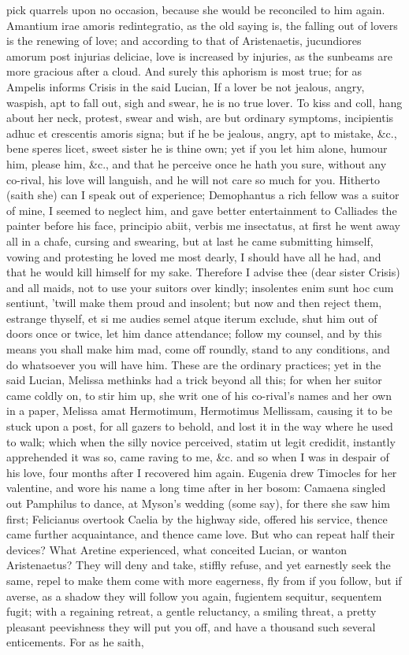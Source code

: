 {pick quarrels upon no occasion, because she would be reconciled to him
again. Amantium irae amoris redintegratio, as the old saying is, the
falling out of lovers is the renewing of love; and according to that of
Aristenaetis, jucundiores amorum post injurias deliciae, love is
increased by injuries, as the sunbeams are more gracious after a cloud.
And surely this aphorism is most true; for as Ampelis informs Crisis in
the said Lucian, If a lover be not jealous, angry, waspish, apt
to fall out, sigh and swear, he is no true lover. To kiss and coll,
hang about her neck, protest, swear and wish, are but ordinary
symptoms, incipientis adhuc et crescentis amoris signa; but if he be
jealous, angry, apt to mistake, \&c., bene speres licet, sweet sister he
is thine own; yet if you let him alone, humour him, please him, \&c.,
and that he perceive once he hath you sure, without any co-rival, his
love will languish, and he will not care so much for you. Hitherto
(saith she) can I speak out of experience; Demophantus a rich fellow
was a suitor of mine, I seemed to neglect him, and gave better
entertainment to Calliades the painter before his face, principio
abiit, verbis me insectatus, at first he went away all in a chafe,
cursing and swearing, but at last he came submitting himself, vowing
and protesting he loved me most dearly, I should have all he had, and
that he would kill himself for my sake. Therefore I advise thee (dear
sister Crisis) and all maids, not to use your suitors over kindly;
insolentes enim sunt hoc cum sentiunt, 'twill make them proud and
insolent; but now and then reject them, estrange thyself, et si me
audies semel atque iterum exclude, shut him out of doors once or twice,
let him dance attendance; follow my counsel, and by this means
you shall make him mad, come off roundly, stand to any
conditions, and do whatsoever you will have him. These are the ordinary
practices; yet in the said Lucian, Melissa methinks had a trick beyond
all this; for when her suitor came coldly on, to stir him up, she writ
one of his co-rival's names and her own in a paper, Melissa amat
Hermotimum, Hermotimus Mellissam, causing it to be stuck upon a post,
for all gazers to behold, and lost it in the way where he used to walk;
which when the silly novice perceived, statim ut legit credidit,
instantly apprehended it was so, came raving to me, \&c. and so
when I was in despair of his love, four months after I recovered him
again. Eugenia drew Timocles for her valentine, and wore his name a
long time after in her bosom: Camaena singled out Pamphilus to dance,
at Myson's wedding (some say), for there she saw him first; Felicianus
overtook Caelia by the highway side, offered his service, thence came
further acquaintance, and thence came love. But who can repeat half
their devices? What Aretine experienced, what conceited Lucian, or
wanton Aristenaetus? They will deny and take, stiffly refuse, and yet
earnestly seek the same, repel to make them come with more eagerness,
fly from if you follow, but if averse, as a shadow they will follow you
again, fugientem sequitur, sequentem fugit; with a regaining retreat, a
gentle reluctancy, a smiling threat, a pretty pleasant peevishness they
will put you off, and have a thousand such several enticements. For as
he saith,

}
